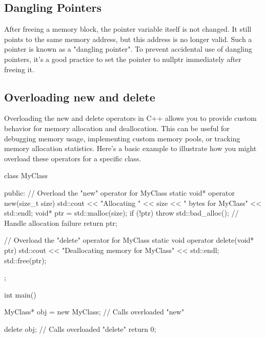 \documentclass{report}
\begin{document}
\begin{concept}
    \bigbreak \noindent 
    \subsection{Dangling Pointers}
    \bigbreak \noindent 
    \begin{concept}
        After freeing a memory block, the pointer variable itself is not changed. It still points to the same memory address, but this address is no longer valid. Such a pointer is known as a "dangling pointer". To prevent accidental use of dangling pointers, it's a good practice to set the pointer to nullptr immediately after freeing it.
    \end{concept}

    \pagebreak 
    \subsection{Overloading new and delete}
    \bigbreak \noindent 
    \begin{concept}
        Overloading the new and delete operators in C++ allows you to provide custom behavior for memory allocation and deallocation. This can be useful for debugging memory usage, implementing custom memory pools, or tracking memory allocation statistics. Here's a basic example to illustrate how you might overload these operators for a specific class.
    \end{concept}
    \bigbreak \noindent 
    \begin{cppcode}
class MyClass {
public:
    // Overload the "new" operator for MyClass
    static void* operator new(size_t size) {
        std::cout << "Allocating " << size << " bytes for MyClass" << std::endl;
        void* ptr = std::malloc(size);
        if (!ptr) throw std::bad_alloc(); // Handle allocation failure
        return ptr;
    }

    // Overload the "delete" operator for MyClass
    static void operator delete(void* ptr) {
        std::cout << "Deallocating memory for MyClass" << std::endl;
        std::free(ptr);
    }
};

int main() {
    MyClass* obj = new MyClass; // Calls overloaded "new"

    delete obj; // Calls overloaded "delete"
    return 0;
}
    \end{cppcode}
    \bigbreak \noindent 

\end{concept}
\end{document}
